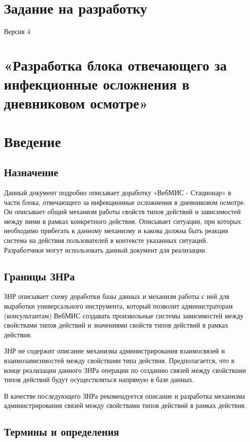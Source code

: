\documentclass[a4paper,8pt]{report} %
\begin{document}
 \section*{Задание на разработку}
 {\tiny Версия 4}
 {\small
 \section*{«Разработка блока отвечающего за инфекционные осложнения в дневниковом осмотре»}
 \section{Введение}

 \subsection{Назначение}
    Данный документ подробно описывает доработку «ВебМИС - Стационар» в части
    блока, отвечающего за инфекционные осложнения в дневниковом осмотре. Он описывает
    общий механизм работы свойств типов действий и зависимостей между ними в рамках
    конкретного действия. Описывает ситуации, при которых необходимо прибегать к данному
    механизму и какова должна быть реакция система на действия пользователей в контексте
    указанных ситуаций. Разработчики могут использовать данный документ для реализации.

 \subsection{Границы ЗНРа}
    ЗНР описывает схему доработки базы данных и механизм работы с ней для
    выработки универсального инструмента, который позволит администраторам
    (консультантам) ВебМИС создавать произвольные системы зависимостей между
    свойствами типов действий и значениями свойств типов действий в рамках действия.

    ЗНР не содержит описание механизма администрирования взаимосвязей и
    взаимозависимостей между свойствами типа действия. Предполагается, что в конце
    реализации данного ЗНРа операции по созданию связей между свойствами типов
    действий будут осуществляться напрямую в базе данных.

    В качестве последующего ЗНРа рекомендуется описание и разработка механизма
    администрирования связей между свойствами типов действий в рамках действия.

 \subsection{Термины и определения}

}
\end{document}
